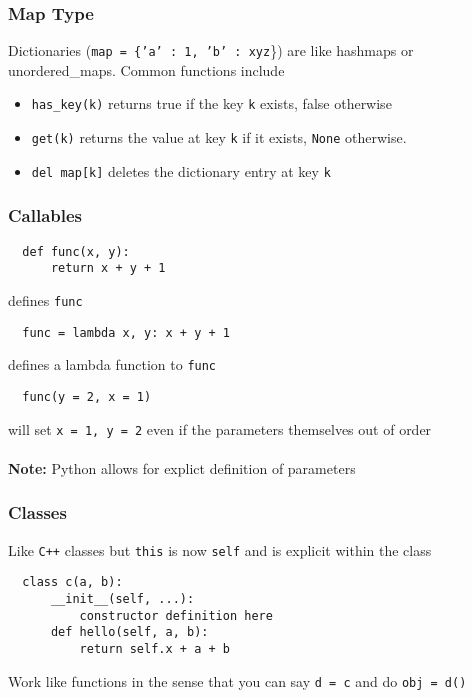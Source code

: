 \documentclass[13pt]{article}
\begin{document}
      \subsubsection{Map Type}
      Dictionaries (\texttt{map = \{'a' : 1, 'b' : xyz}\}) are like hashmaps or unordered\_maps. Common functions include
      \begin{itemize}[leftmargin = 0pt]
      \item [] \texttt{has\_key(k)} returns true if the key \texttt{k} exists, false otherwise
      \item [] \texttt{get(k)} returns the value at key \texttt{k} if it exists, \texttt{None} otherwise.
      \item [] \texttt{del map[k]} deletes the dictionary entry at key \texttt{k}
      \end{itemize}
      
      \subsubsection{Callables}
\begin{verbatim}
  def func(x, y):
      return x + y + 1 \end{verbatim}
    defines \texttt{func}
\begin{verbatim}
  func = lambda x, y: x + y + 1 \end{verbatim}
defines a lambda function to \texttt{func}
\begin{verbatim}
  func(y = 2, x = 1) \end{verbatim}
will set \texttt{x = 1, y = 2} even if the parameters themselves out of order \\ \\
\textbf{Note:} Python allows for explict definition of parameters

\subsubsection{Classes}
Like \texttt{C++} classes but \texttt{this} is now \texttt{self} and is explicit within the class
\begin{verbatim}
  class c(a, b):
      __init__(self, ...):
          constructor definition here
      def hello(self, a, b):
          return self.x + a + b \end{verbatim}
        Work like functions in the sense that you can say \texttt{d = c} and do \texttt{obj = d()}
\end{document}
